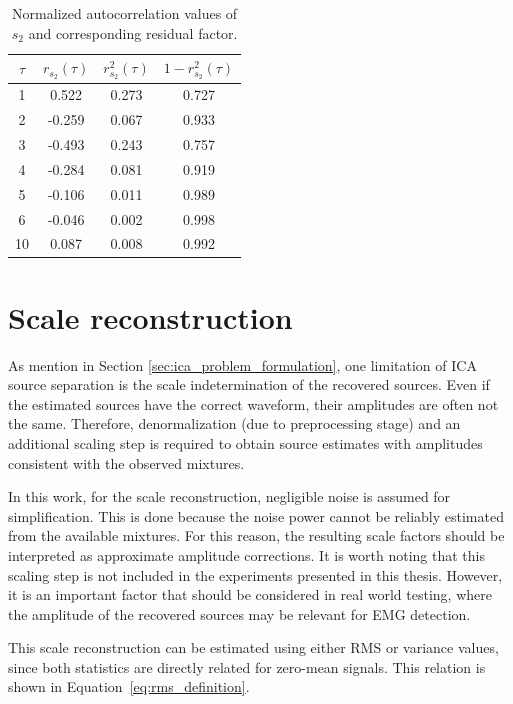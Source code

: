 \begin{table}[H]
\centering


\begin{tabular}{c|c|c|c}
\hline
$\tau$ & $r_{s_2}(\tau)$ & $r_{s_2}^2(\tau)$ & $1-r_{s_2}^2(\tau)$ \\
\hline
1  &  0.522 & 0.273 & 0.727 \\
2  & -0.259 & 0.067 & 0.933 \\
3  & -0.493 & 0.243 & 0.757 \\
4  & -0.284 & 0.081 & 0.919 \\
5  & -0.106 & 0.011 & 0.989 \\
6  & -0.046 & 0.002 & 0.998 \\
10 &  0.087 & 0.008 & 0.992 \\
\hline
\end{tabular}
\caption{Normalized autocorrelation values of $s_2$ and corresponding residual factor.}
\label{tab:autocorr_residual_tau}
\end{table}

\clearpage


\section{Scale reconstruction}
\label{sec:scale_reconstruction}
As mention in Section \ref{sec:ica_problem_formulation}, one limitation of ICA source separation is the scale indetermination of the recovered sources. Even if the estimated sources have the correct waveform, their amplitudes are often not the same. Therefore, denormalization (due to preprocessing stage) and an additional scaling step is required to obtain source estimates with amplitudes consistent with the observed mixtures.

In this work, for the scale reconstruction, negligible noise is assumed  for simplification. This is done because the noise power cannot be reliably estimated from the available mixtures. For this reason, the resulting scale factors should be interpreted as approximate amplitude corrections. It is worth noting that this scaling step is not included in the experiments presented in this thesis. However, it is an important factor that should be considered in real world testing, where the amplitude of the recovered sources may be relevant for EMG detection.


This scale reconstruction can be estimated using either RMS or variance values,
since both statistics are directly related for zero-mean signals. This relation
is shown in Equation~\ref{eq:rms_definition}.

